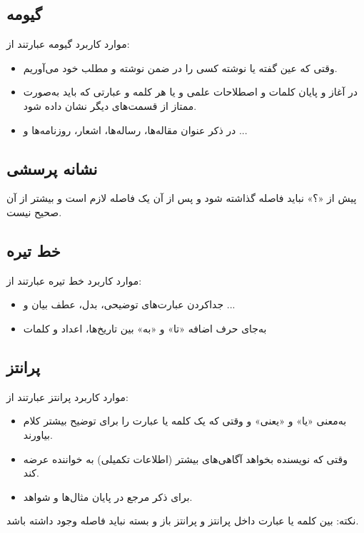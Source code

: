 \subsection{گیومه}
موارد کاربرد گیومه عبارتند از:
\begin{itemize}
\item
وقتی که عین گفته یا نوشته کسی را در ضمن نوشته و مطلب خود می‌آوریم. 
\item
در آغاز و پایان کلمات و اصطلاحات علمی و یا هر کلمه و عبارتی که باید به‌صورت ممتاز از قسمت‌های دیگر نشان داده شود.
\item
در ذکر عنوان مقاله‌ها، رساله‌ها، اشعار، روزنامه‌ها و ...
\end{itemize}
\subsection{نشانه پرسشی}
پیش از «؟» نباید فاصله گذاشته شود و پس از آن یک فاصله لازم است و بیشتر از آن صحیح نیست.
\subsection{خط تیره}
موارد کاربرد خط تیره عبارتند از:
\begin{itemize}
\item
جدا‌کردن عبارت‌های توضیحی، بدل، عطف بیان و ...
\item
به‌جای حرف اضافه «تا» و «به» بین تاریخ‌ها، اعداد و کلمات
\end{itemize}
\subsection{پرانتز}
موارد کاربرد پرانتز عبارتند از:
\begin{itemize}
\item
به‌معنی «یا» و «یعنی» و وقتی که یک کلمه یا عبارت را برای توضیح بیشتر کلام بیاورند.
\item
وقتی که نویسنده بخواهد آگاهی‌های بیشتر (اطلاعات تکمیلی) به خواننده عرضه کند.
\item
برای ذکر مرجع در پایان مثال‌ها و شواهد.
\end{itemize}
نکته: بین کلمه یا عبارت داخل پرانتز و پرانتز باز و بسته نباید فاصله وجود داشته باشد.
